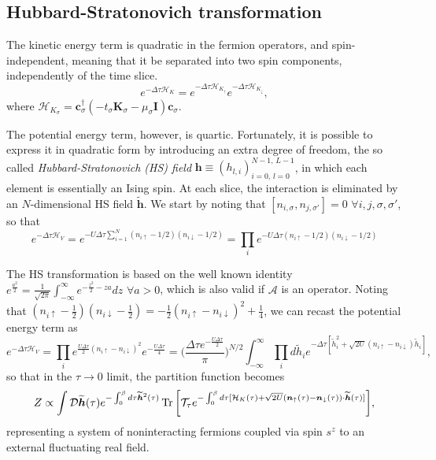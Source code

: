 \subsection{Hubbard-Stratonovich transformation}\label{subsec:HStransf}

The kinetic energy term is quadratic in the fermion operators, and spin-independent, meaning that it be separated into two spin components, independently of the time slice.
\begin{equation}
e^{-\Delta\tau \mathcal{H}_K} = e^{-\Delta\tau \mathcal{H}_{K_\uparrow}} e^{-\Delta\tau \mathcal{H}_{K_\downarrow}} ,
\end{equation}
where $\mathcal{H}_{K_\sigma} = \bm c_\sigma^\dagger (-t_\sigma \bm K_\sigma - \mu_\sigma \bm I )  \bm c_\sigma$.

The potential energy term, however, is quartic.
Fortunately, it is possible to express it in quadratic form by introducing an extra degree of freedom, the so called \emph{Hubbard-Stratonovich (HS) field} $\bm h \equiv (h_{l, i})_{i=0,\, l= 0}^{N-1, \, L - 1}$, in which each element is essentially an Ising spin.
At each slice, the interaction is eliminated by an $N$-dimensional HS field $\widetilde{\bm h}$.
We start by noting that $[ n_{i,\sigma} , n_{j,\sigma'} ] = 0 \,\, \forall i, j, \sigma, \sigma'$, so that
\begin{equation}\label{eq:Hint}
e^{-\Delta\tau \mathcal{H}_V} = e^{-U \Delta\tau \sum_{i=1}^N (n_{i\uparrow} - 1/2 ) (n_{i\downarrow} - 1/2 )} = \prod_i e^{-U \Delta\tau (n_{i\uparrow} - 1/2 ) (n_{i\downarrow} - 1/2 )}
\end{equation}

The HS transformation is based on the well known identity 
$
e^{ \frac{a^2}{2}} = \frac{1}{\sqrt{2\pi}} \int_{-\infty}^{\infty} e^{-\frac{z^2}{2}  - za } dz
$ 
$ \forall a > 0$, 
which is also valid if $\mathcal{A}$ is an operator.
Noting that $(n_{i\uparrow} - \frac{1}{2} ) (n_{i\downarrow} - \frac{1}{2} ) = -\frac{1}{2} ( n_{i\uparrow} - n_{i\downarrow} )^2 + \frac{1}{4}$, we can recast the potential energy term as
\begin{equation}
e^{-\Delta\tau \mathcal{H}_V} = \prod_i e^{ \frac{U \Delta \tau}{2} ( n_{i\uparrow} - n_{i\downarrow} )^2 } e^{- \frac{U \Delta \tau}{4}}
=\bigg( \frac{\Delta \tau e^{- \frac{U \Delta \tau}{2}}}{\pi} \bigg)^{N/2} \int_{-\infty}^\infty \prod_i d \widetilde{h}_i e^{-\Delta \tau [ \widetilde{h}_i^2 + \sqrt{2U} ( n_{i\uparrow} - n_{i\downarrow} ) \widetilde{h}_i ]} ,
\end{equation}
so that in the $\tau \rightarrow 0$ limit, the partition function becomes
\begin{equation}
Z \propto \int \mathcal{D} \widetilde{\bm h} ( \tau) e^{-\int_0^\beta d\tau \widetilde{\bm h}^2 ( \tau ) } \operatorname{Tr} \bigg[ \mathcal{T}_\tau e^{ -\int_0^\beta d\tau [ \mathcal{H}_K ( \tau ) + \sqrt{2U} ( \bm n_{\uparrow} (\tau) - \bm n_{\downarrow} (\tau ) ) \cdot \widetilde{\bm h}(\tau) ] } \bigg] ,
\end{equation}
representing a system of noninteracting fermions coupled via spin $s^z$ to an external fluctuating real field.

